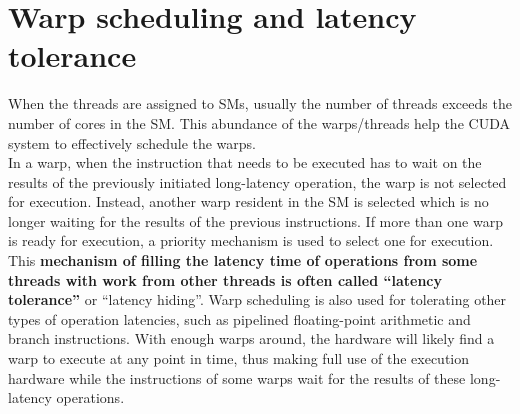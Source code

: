 \section{Warp scheduling and latency tolerance}
When the threads are assigned to SMs, usually the number of threads exceeds the number of cores in the SM. This abundance of the warps/threads help the CUDA system to effectively schedule the warps.\\
In a warp, when the instruction that needs to be executed has to wait on the results of the previously initiated long-latency operation, the warp is not selected for execution. Instead, another warp resident in the SM is selected which is no longer waiting for the results of the previous instructions. If more than one warp is ready for execution, a priority mechanism is used to select one for execution.\\
\linebreak
This \textbf{mechanism of filling the latency time of operations from some threads with work from other threads is often called \enquote{latency tolerance}} or \enquote{latency hiding}. Warp scheduling is also used for tolerating other types of operation
latencies, such as pipelined floating-point arithmetic and branch instructions. With enough warps around, the hardware will likely find a warp to execute at any point in time, thus making full use of the execution hardware while the instructions of some warps wait for the results of these long-latency operations.

